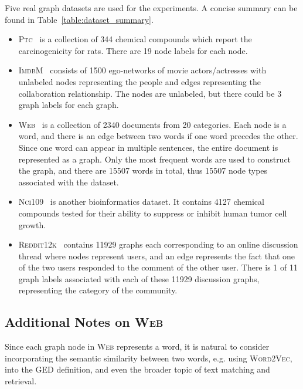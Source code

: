 \documentclass{article}
\newcommand{\wv}{\textsc{Word2Vec}\xspace}
\newcommand{\ptc}{\textsc{Ptc}\xspace}
\newcommand{\imdb}{\textsc{ImdbM}\xspace}
\newcommand{\web}{\textsc{Web}\xspace}
\newcommand{\nci}{\textsc{Nci109}\xspace}
\newcommand{\reddit}{\textsc{Reddit12k}\xspace}
\begin{document}
Five real graph datasets are used for the experiments. A concise summary can be found in Table~\ref{table:dataset_summary}.


\begin{itemize}
     \item \ptc~\cite{shrivastava2014new} is a collection of 344 chemical compounds which report the carcinogenicity for rats. There are 19 node labels for each node.
    
    \item \imdb~\cite{yanardag2015deep} consists of 1500 ego-networks of movie actors/actresses with unlabeled nodes representing the people and edges representing the collaboration relationship. The nodes are unlabeled, but there could be 3 graph labels for each graph. 
    
    \item \web~\cite{riesen2008iam} is a collection of 2340 documents from 20 categories. Each node is a word, and there is an edge between two words if one word precedes the other. Since one word can appear in multiple sentences, the entire document is represented as a graph. Only the most frequent words are used to construct the graph, and there are 15507 words in total, thus 15507 node types associated with the dataset.
    
    \item \nci~\cite{wale2008comparison} is another bioinformatics dataset. It contains 4127 chemical compounds tested for their ability to suppress or inhibit human tumor cell growth.
    
    \item \reddit~\cite{yanardag2015deep} contains 11929 graphs each corresponding to an online discussion thread where nodes represent users, and an edge represents the fact that one of the two users responded to the comment of the other user. There is 1 of 11 graph labels associated with each of these 11929 discussion graphs, representing the category of the community.
\end{itemize}


\subsection{Additional Notes on \web}
\label{subsec-notes-web}

Since each graph node in \web represents a word, it is natural to consider incorporating the semantic similarity between two words, e.g. using \wv, into the GED definition, and even the broader topic of text matching and retrieval. 
\end{document}
